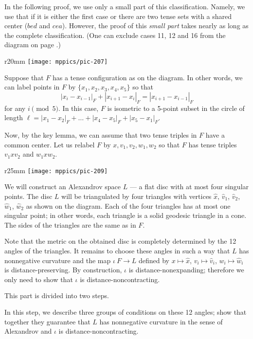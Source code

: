 \documentclass{article}
\begin{document}
In the following proof, we use only a small part of this classification.
Namely, we use that if it is either the first case or there are two tense sets with a shared center ($bed$ and $cea$).  
However, the proof of this \emph{small part} takes nearly as long as the complete classification.
(One can exclude cases 11, 12 and 16 from the diagram on page \pageref{pic-210}.) 

\begin{wrapfigure}{r}{20mm}
\vskip-6mm
\centering
\texttt{[image: mppics/pic-207]}
\end{wrapfigure}

Suppose that $F$ has a tense configuration as on the diagram.
In other words, we can label points in $F$  by $\{x_1,x_2,x_3,x_4,x_5\}$ so that
\[|x_{i}-x_{i-1}|_F+|x_{i+1}-x_{i}|_F=|x_{i+1}-x_{i-1}|_F\]
for any $i\pmod 5$.
In this case, $F$ is isometric to a 5-point subset in the circle of length 
$\ell=|x_1-x_2|_F+\dots+|x_4-x_5|_F+|x_5-x_1|_F$.

Now, by the key lemma, we can assume that two tense triples in $F$ have a common center.
Let us relabel $F$ by $x,v_1,v_2,w_1,w_2$ so that $F$ has tense triples $v_1xv_2$ and $w_1xw_2$.

\begin{wrapfigure}{r}{25mm}
\vskip-6mm
\centering
\texttt{[image: mppics/pic-209]}
\end{wrapfigure}

We will construct an Alexandrov space $L$ --- a flat disc with at most four singular points.
The disc $L$ will be triangulated by four triangles with vertices $\hat x$, $\hat v_1$, $\hat v_2$, $\hat w_1$, $\hat w_2$ as shown on the diagram.
Each of the four triangles has at most one singular point;
in other words, each triangle is a solid geodesic triangle in a cone.
The sides of the triangles are the same as in $F$.

Note that the metric on the obtained disc is completely determined by the 12 angles of the triangles.
It remains to choose these angles in such a way that $L$ has nonnegative curvature and the map $\iota\:F\to L$ defined by $x\mapsto \hat x$, $v_i\mapsto \hat v_i$, $w_i\mapsto \hat w_i$ is distance-preserving.
By construction, $\iota$ is distance-nonexpanding; therefore we only need to show that $\iota$ is distance-noncontracting.

This part is divided into two steps.

In this step, we describe three groups of conditions on these 12 angles; show that together they guarantee that $L$ has nonnegative curvature in the sense of Alexandrov and $\iota$ is distance-noncontracting.
\end{document}
